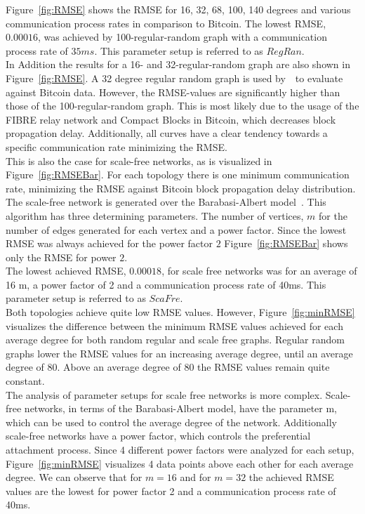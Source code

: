 Figure~\ref{fig:RMSE} shows the RMSE for 16, 32, 68, 100, 140 degrees and various communication process rates in comparison to Bitcoin. The lowest RMSE, $0.00016$, was achieved by 100-regular-random graph with a communication process rate of $35ms$. This parameter setup is referred to as $RegRan$.\\
In Addition the results for a 16- and 32-regular-random graph are also shown in Figure~\ref{fig:RMSE}. A 32 degree regular random graph is used by~~to evaluate against Bitcoin data. However, the RMSE-values are significantly higher than those of the 100-regular-random graph. This is most likely due to the usage of the FIBRE relay network and Compact Blocks in Bitcoin, which decreases block propagation delay. Additionally, all curves have a clear tendency towards a specific communication rate minimizing the RMSE.\\
This is also the case for scale-free networks, as is visualized in Figure~\ref{fig:RMSEBar}. For each topology there is one minimum communication rate, minimizing the RMSE against Bitcoin block propagation delay distribution. The scale-free network is generated over the Barabasi-Albert model~\cite{BarabasiAlbert}. This algorithm has three determining parameters. The number of vertices, $m$ for the number of edges generated for each vertex and a power factor. Since the lowest RMSE was always achieved for the power factor $2$ Figure~\ref{fig:RMSEBar} shows only the RMSE for power $2$.\\
The lowest achieved RMSE, $0.00018$, for scale free networks was for an average of 16 m, a power factor of 2 and a communication process rate of 40ms. This parameter setup is referred to as $ScaFre$.\\
Both topologies achieve quite low RMSE values. However, Figure~\ref{fig:minRMSE} visualizes the difference between the minimum RMSE values achieved for each average degree for both random regular and scale free graphs.
Regular random graphs lower the RMSE values for an increasing average degree, until an average degree of 80. Above an average degree of 80 the RMSE values remain quite constant.\\
The analysis of parameter setups for scale free networks is more complex. Scale-free networks, in terms of the Barabasi-Albert model, have the parameter m, which can be used to control the average degree of the network. Additionally scale-free networks have a power factor, which controls the preferential attachment process. Since 4 different power factors were analyzed for each setup, Figure~\ref{fig:minRMSE} visualizes 4 data points above each other for each average degree. We can observe that for $m=16$ and for $m=32$ the achieved RMSE values are the lowest for power factor 2 and a communication process rate of 40ms.\\
